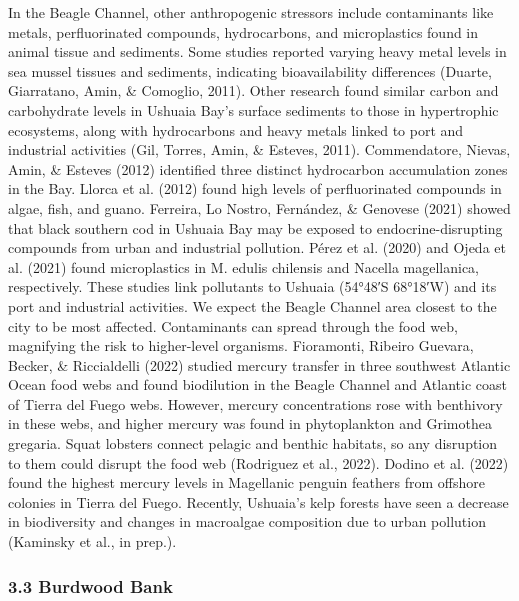 \documentclass[
]{article}
\begin{document}
In the Beagle Channel, other anthropogenic stressors include
contaminants like metals, perfluorinated compounds, hydrocarbons, and
microplastics found in animal tissue and sediments. Some studies
reported varying heavy metal levels in sea mussel tissues and sediments,
indicating bioavailability differences (Duarte, Giarratano, Amin, \&
Comoglio, 2011). Other research found similar carbon and carbohydrate
levels in Ushuaia Bay's surface sediments to those in hypertrophic
ecosystems, along with hydrocarbons and heavy metals linked to port and
industrial activities (Gil, Torres, Amin, \& Esteves, 2011).
Commendatore, Nievas, Amin, \& Esteves (2012) identified three distinct
hydrocarbon accumulation zones in the Bay. Llorca et al. (2012) found
high levels of perfluorinated compounds in algae, fish, and guano.
Ferreira, Lo Nostro, Fernández, \& Genovese (2021) showed that black
southern cod in Ushuaia Bay may be exposed to endocrine-disrupting
compounds from urban and industrial pollution. Pérez et al. (2020) and
Ojeda et al. (2021) found microplastics in M. edulis chilensis and
Nacella magellanica, respectively. These studies link pollutants to
Ushuaia (54°48′S 68°18′W) and its port and industrial activities. We
expect the Beagle Channel area closest to the city to be most affected.
Contaminants can spread through the food web, magnifying the risk to
higher-level organisms. Fioramonti, Ribeiro Guevara, Becker, \&
Riccialdelli (2022) studied mercury transfer in three southwest Atlantic
Ocean food webs and found biodilution in the Beagle Channel and Atlantic
coast of Tierra del Fuego webs. However, mercury concentrations rose
with benthivory in these webs, and higher mercury was found in
phytoplankton and Grimothea gregaria. Squat lobsters connect pelagic and
benthic habitats, so any disruption to them could disrupt the food web
(Rodriguez et al., 2022). Dodino et al. (2022) found the highest mercury
levels in Magellanic penguin feathers from offshore colonies in Tierra
del Fuego. Recently, Ushuaia's kelp forests have seen a decrease in
biodiversity and changes in macroalgae composition due to urban
pollution (Kaminsky et al., in prep.).

\hypertarget{burdwood-bank}{%
\subsubsection{3.3 Burdwood Bank}\label{burdwood-bank}}
\end{document}
